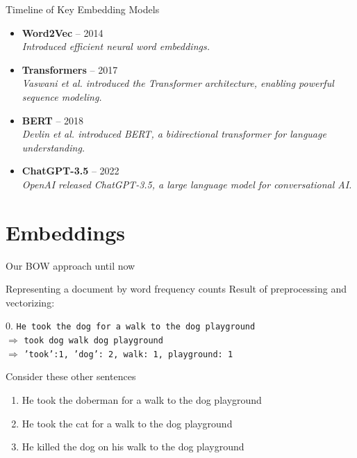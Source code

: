 \documentclass[compress]{beamer}
\begin{document}
\begin{frame}{Timeline of Key Embedding Models}
\small
\begin{itemize}
    \item \textbf{Word2Vec} -- 2014\\
    \hspace{1em}\textit{Introduced efficient neural word embeddings.}
    \vspace{0.5em}
    \item \textbf{Transformers} -- 2017\\
    \hspace{1em}\textit{Vaswani et al. introduced the Transformer architecture, enabling powerful sequence modeling.}
    \vspace{0.5em}
    \item \textbf{BERT} -- 2018\\
    \hspace{1em}\textit{Devlin et al. introduced BERT, a bidirectional transformer for language understanding.}
    \vspace{0.5em}
    \item \textbf{ChatGPT-3.5} -- 2022\\
    \hspace{1em}\textit{OpenAI released ChatGPT-3.5, a large language model for conversational AI.}
\end{itemize}
\end{frame}

\section{Embeddings}

\begin{frame}{Our BOW approach until now}
	\begin{block}{Representing a document by word frequency counts}
		Result of preprocessing and vectorizing:
		
		0. \texttt{He took the dog for a walk to the dog playground}\\
		$\Rightarrow$ \texttt{took dog walk dog playground}\\
		$\Rightarrow$ \texttt{'took':1, 'dog': 2, walk: 1, playground: 1}
	\end{block}
	
	Consider these other sentences
	\begin{enumerate}
		\item<2-> He took the doberman for a walk to the dog playground
		\item<3-> He took the cat for a walk to the dog playground
		\item<4-> He killed the dog on his walk to the dog playground 
	\end{enumerate}
	
\end{frame}
\end{document}

